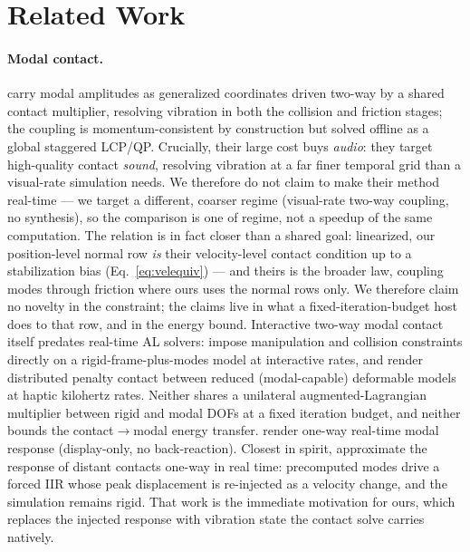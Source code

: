 \section{Related Work}
\label{sec:related}

\paragraph*{Modal contact.} \citet{zheng2011} carry modal amplitudes as
generalized coordinates driven two-way by a shared contact multiplier, resolving
vibration in both the collision and friction stages; the coupling is
momentum-consistent by construction but solved offline as a global staggered LCP/QP.
Crucially, their large cost buys \emph{audio}: they target high-quality contact
\emph{sound}, resolving vibration at a far finer temporal grid than a visual-rate
simulation needs. We therefore do not claim to make their method real-time --- we
target a different, coarser regime (visual-rate two-way coupling, no synthesis), so
the comparison is one of regime, not a speedup of the same computation.
The relation is in fact closer than a shared goal: linearized, our
position-level normal row \emph{is} their velocity-level contact condition up
to a stabilization bias (Eq.~\ref{eq:velequiv}) --- and theirs is the broader
law, coupling modes through friction where ours uses the normal rows only. We
therefore claim no novelty in the constraint; the claims live in what a
fixed-iteration-budget host does to that row, and in the energy bound.
Interactive two-way modal contact itself predates real-time AL solvers:
\citet{hauser2003} impose manipulation and collision constraints directly on a
rigid-frame-plus-modes model at interactive rates, and \citet{barbic2008haptic}
render distributed penalty contact between reduced (modal-capable) deformable
models at haptic kilohertz rates. Neither shares a unilateral
augmented-Lagrangian multiplier between rigid and modal DOFs at a fixed
iteration budget, and neither bounds the contact$\to$modal energy transfer.
\citet{james2002dyrt} render one-way real-time modal response (display-only, no
back-reaction).
Closest in spirit, \citet{coevoet2020distant} approximate the response of
distant contacts one-way in real time: precomputed modes drive a forced IIR
whose peak displacement is re-injected as a velocity change, and the
simulation remains rigid. That work is the immediate motivation for ours,
which replaces the injected response with vibration state the contact solve
carries natively.

